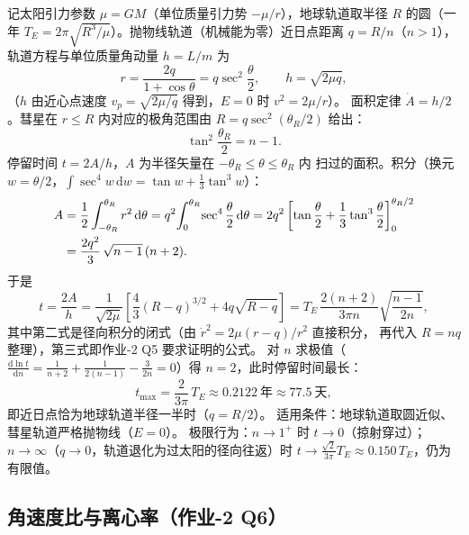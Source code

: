 \documentclass[UTF8,a4paper,11pt]{ctexart}
\begin{document}
记太阳引力参数 $\mu=GM$（单位质量引力势 $-\mu/r$），地球轨道取半径 $R$
的圆（一年 $T_E=2\pi\sqrt{R^3/\mu}$）。抛物线轨道（机械能为零）近日点距离
$q=R/n$（$n>1$），轨道方程与单位质量角动量 $h=L/m$ 为
\begin{equation}
  r=\frac{2q}{1+\cos\theta}=q\sec^2\frac{\theta}{2},
  \qquad h=\sqrt{2\mu q},
  \label{eq:parab}
\end{equation}
（$h$ 由近心点速度 $v_p=\sqrt{2\mu/q}$ 得到，$E=0$ 时 $v^2=2\mu/r$）。
面积定律 $\dot A=h/2$。彗星在 $r\le R$ 内对应的极角范围由
$R=q\sec^2(\theta_R/2)$ 给出：
\begin{equation}
  \tan^2\frac{\theta_R}{2}=n-1.
  \label{eq:thR}
\end{equation}
停留时间 $t=2A/h$，$A$ 为半径矢量在 $-\theta_R\le\theta\le\theta_R$ 内
扫过的面积。积分（换元 $w=\theta/2$，$\int\sec^4w\,\mathrm{d}w=\tan w+\frac13\tan^3w$）：
\begin{align}
  A&=\frac12\int_{-\theta_R}^{\theta_R}r^2\,\mathrm{d}\theta
   =q^2\!\int_0^{\theta_R}\!\sec^4\frac{\theta}{2}\,\mathrm{d}\theta
   =2q^2\left[\tan\frac{\theta}{2}+\frac13\tan^3\frac{\theta}{2}\right]_0^{\theta_R/2}
   \notag\\
  &=\frac{2q^2}{3}\,\sqrt{n-1}\,(n+2).
  \label{eq:area}
\end{align}
于是
\begin{equation}
  t=\frac{2A}{h}
  =\frac{1}{\sqrt{2\mu}}\left[\frac43(R-q)^{3/2}+4q\sqrt{R-q}\right]
  =T_E\,\frac{2(n+2)}{3\pi n}\sqrt{\frac{n-1}{2n}},
  \label{eq:dwell}
\end{equation}
其中第二式是径向积分的闭式（由 $\dot r^2=2\mu(r-q)/r^2$ 直接积分，
再代入 $R=nq$ 整理），第三式即作业-2 Q5 要求证明的公式。
对 $n$ 求极值（$\frac{\mathrm{d}\ln t}{\mathrm{d}n}
=\frac1{n+2}+\frac1{2(n-1)}-\frac3{2n}=0$）得 $n=2$，此时停留时间最长：
\begin{equation}
  t_{\max}=\frac{2}{3\pi}\,T_E\approx0.2122\ \text{年}\approx77.5\ \text{天},
  \label{eq:dwellmax}
\end{equation}
即近日点恰为地球轨道半径一半时（$q=R/2$）。
适用条件：地球轨道取圆近似、彗星轨道严格抛物线（$E=0$）。
极限行为：$n\to1^+$ 时 $t\to0$（掠射穿过）；
$n\to\infty$（$q\to0$，轨道退化为过太阳的径向往返）时
$t\to\frac{\sqrt2}{3\pi}T_E\approx0.150\,T_E$，仍为有限值。

\subsection{角速度比与离心率（作业-2 Q6）}
\label{sub:omegaratio}
\end{document}
